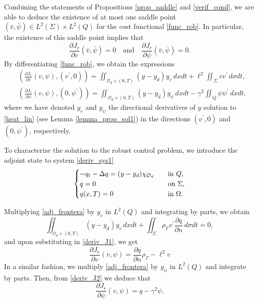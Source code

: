 \documentclass{dcds-bOF}
\theoremstyle{definition}
\def\csbd{\rho_{\Gamma}}
\begin{document}
Combining the statements of Propositions \ref{prop_saddle} and \ref{verif_cond}, we are able to deduce the existence of at most one saddle point $(\bar v,\bar \psi)\in L^2(\Sigma)\times L^2(Q)$ for the cost functional \eqref{func_rob}. In particular, the existence of this saddle point implies that
%
\begin{equation*}
\frac{\partial J_r}{\partial v}(\bar v,\bar \psi)=0 \quad \text{and}\quad \frac{\partial J_r}{\partial \psi}(\bar v,\bar \psi)=0.
\end{equation*}
%
By differentiating \eqref{func_rob}, we obtain the expressions
%
\begin{align}\label{deriv_J1}
&\left(\frac{\partial J_r}{\partial v}(v,\psi),(v^\prime,0)\right)=\iint_{\mathcal O_d\times(0,T)}(y-y_d)y_v\,dxdt+\ell^2\iint_{\Sigma}vv^\prime\,d\sigma dt, \\ \label{deriv_J2}
&\left(\frac{\partial J_r}{\partial \psi}(v,\psi),(0,\psi^\prime)\right)=\iint_{\mathcal O_d\times(0,T)}(y-y_d)y_\psi\,dxdt-\gamma^2\iint_{Q}\psi\psi^\prime\,dxdt,
\end{align}
%
where we have denoted $y_v$ and $y_\psi$ the directional derivatives of $y$ solution to \eqref{heat_lin} (see Lemma \ref{lemma_prop_sol1}) in the directions $(v^\prime,0)$ and $(0,\psi^\prime)$, respectively.

To characterize the solution to the robust control problem, we introduce the adjoint state to system \eqref{deriv_sys1}
%
\begin{equation}\label{adj_frontera}
\begin{cases}
-q_t-\Delta q=(y-y_d)\chi_{\mathcal O_d} \quad& \text{in }Q, \\
q=0 \quad &\textnormal{on $\Sigma$,} \\
q(x,T)=0 \quad &\textnormal{in $\Omega$}.
\end{cases}
\end{equation}

Multiplying \eqref{adj_frontera} by $y_v$ in $L^2(Q)$ and integrating by parts, we obtain
%
\begin{equation*}
\iint_{\mathcal O_d\times(0,T)}(y-y_d)y_v\,dxdt+\iint_{\Sigma}\csbd v^\prime\frac{\partial q}{\partial n}\,d\sigma dt=0,
\end{equation*}
%
and upon substituting in \eqref{deriv_J1}, we get
%
\begin{equation*}
\frac{\partial J_r}{\partial v}(v,\psi)=\frac{\partial q}{\partial n}\csbd-\ell^2v
\end{equation*}
%
In a similar fashion, we multiply \eqref{adj_frontera} by $y_\psi$ in $L^2(Q)$ and integrate by parts. Then, from \eqref{deriv_J2} we deduce that
%
\begin{equation*}
\frac{\partial J_r}{\partial \psi}(v,\psi)=q-\gamma^2\psi.
\end{equation*}
\end{document}
